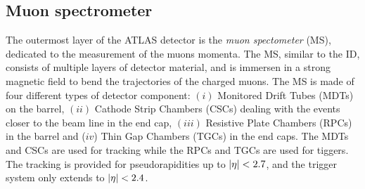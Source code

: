 \documentclass[14pt, a4paper]{book}
\begin{document}
\subsection{Muon spectrometer}\label{sec:MS}
The outermost layer of the ATLAS detector is the \textit{muon spectometer} (MS), dedicated to the measurement of the muons momenta. The MS, similar to the ID, consists of multiple layers of detector material, 
and is immersen in a strong magnetic field to bend the trajectories of the charged muons. The MS is made of four different types of detector component: $(i)$ Monitored Drift Tubes (MDTs) on the barrel, 
$(ii)$ Cathode Strip Chambers (CSCs) dealing with the events closer to the beam line in the end cap, $(iii)$ Resistive Plate Chambers (RPCs) in the barrel and ($iv$) Thin Gap Chambers (TGCs) in the end caps. 
The MDTs and CSCs are used for tracking while the RPCs and TGCs are used for tiggers. The tracking is provided for pseudorapidities up to $\abs{\eta}<2.7$, and the trigger system only extends to $\abs{\eta}<2.4$.
\end{document}
